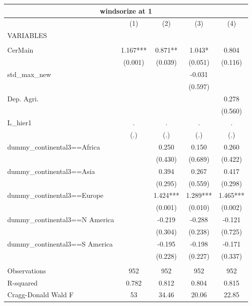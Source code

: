 \documentclass[12pt,a4paper]{article}
\begin{document}
\begin{tabular}{lcccc}
\multicolumn{5}{c}{windsorize at 1} \\ \hline
 & (1) & (2) & (3) & (4) \\
VARIABLES &  &  &  &  \\ \hline
 &  &  &  &  \\
CerMain & 1.167*** & 0.871** & 1.043* & 0.804 \\
 & (0.001) & (0.039) & (0.051) & (0.116) \\
std\_max\_new &  &  & -0.031 &  \\
 &  &  & (0.597) &  \\
Dep. Agri. &  &  &  & 0.278 \\
 &  &  &  & (0.560) \\
L\_hier1 & . & . & . & . \\
 & (.) & (.) & (.) & (.) \\
dummy\_continental3==Africa &  & 0.250 & 0.150 & 0.260 \\
 &  & (0.430) & (0.689) & (0.422) \\
dummy\_continental3==Asia &  & 0.394 & 0.267 & 0.417 \\
 &  & (0.295) & (0.559) & (0.298) \\
dummy\_continental3==Europe &  & 1.424*** & 1.289*** & 1.465*** \\
 &  & (0.001) & (0.010) & (0.002) \\
dummy\_continental3==N America &  & -0.219 & -0.288 & -0.121 \\
 &  & (0.304) & (0.238) & (0.725) \\
dummy\_continental3==S America &  & -0.195 & -0.198 & -0.171 \\
 &  & (0.228) & (0.227) & (0.337) \\
 &  &  &  &  \\
Observations & 952 & 952 & 952 & 952 \\
R-squared & 0.782 & 0.812 & 0.804 & 0.815 \\
 Cragg-Donald Wald F & 53 & 34.46 & 20.06 & 22.85 \\ \hline
\end{tabular}
\end{document}
